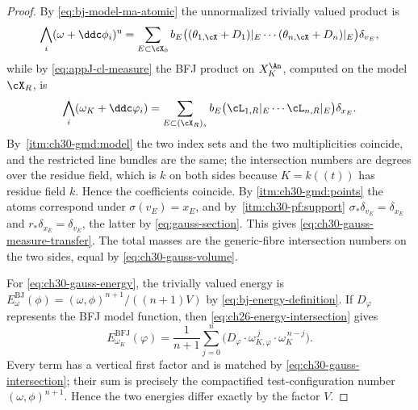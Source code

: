 \begin{proof}
By \eqref{eq:bj-model-ma-atomic} the unnormalized trivially valued product
is
\[
 \bigwedge_{i}(\omega+\ddc\phi_i)^{\mathrm u}
 =\sum_{E\subset\cX_0}b_E
   \bigl((\theta_{1,\cX}+D_1)|_E\cdots(\theta_{n,\cX}+D_n)|_E\bigr)
   \delta_{v_E},
\]
while by \eqref{eq:appJ-cl-measure} the BFJ product on \(X_K^{\An}\),
computed on the model \(\cX_R\), is
\[
 \bigwedge_i(\omega_K+\ddc\varphi_i)
 =\sum_{E\subset(\cX_R)_s}b_E
   \bigl(\cL_{1,R}|_E\cdots\cL_{n,R}|_E\bigr)\delta_{x_E}.
\]
By \,\cref{itm:ch30-gmd:model} the two
index sets and the two multiplicities coincide, and the restricted line
bundles are the same; the intersection numbers are degrees over the residue
field, which is \(k\) on both sides because \(K=k(\!(t)\!)\) has residue
field \(k\).  Hence the coefficients coincide.  By
\cref{itm:ch30-gmd:points} the atoms correspond under
\(\sigma(v_E)=x_E\), and by
\,\cref{itm:ch30-pf:support}
\(\sigma_*\delta_{v_E}=\delta_{x_E}\) and
\(r_*\delta_{x_E}=\delta_{v_E}\), the latter by
\eqref{eq:gauss-section}.  This gives
\eqref{eq:ch30-gauss-measure-transfer}.  The total masses are the
generic-fibre intersection numbers on the two sides, equal by
\eqref{eq:ch30-gauss-volume}.

For \eqref{eq:ch30-gauss-energy}, the trivially valued energy is
\(E^{\mathrm{BJ}}_\omega(\phi)=(\omega,\phi)^{n+1}/((n+1)V)\) by
\eqref{eq:bj-energy-definition}.  If \(D_\varphi\) represents the BFJ model
function, then \eqref{eq:ch26-energy-intersection} gives
\[
 E^{\mathrm{BFJ}}_{\omega_K}(\varphi)
 =\frac1{n+1}\sum_{j=0}^n
   \bigl(D_\varphi\cdot\omega_{K,\varphi}^{\,j}
                         \cdot\omega_K^{\,n-j}\bigr).
\]
Every term has a vertical first factor and is matched by
\eqref{eq:ch30-gauss-intersection}; their sum is precisely the compactified
test-configuration number \((\omega,\phi)^{n+1}\).  Hence the two energies
differ exactly by the factor \(V\).
\end{proof}

